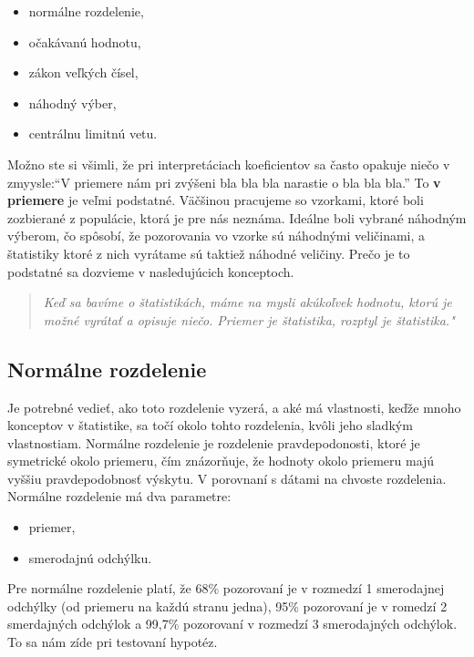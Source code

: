 \begin{itemize}
\tightlist
\item
  normálne rozdelenie,
\item
  očakávanú hodnotu,
\item
  zákon veľkých čísel,
\item
  náhodný výber,
\item
  centrálnu limitnú vetu.
\end{itemize}

Možno ste si všimli, že pri interpretáciach koeficientov sa často
opakuje niečo v zmyysle:``V priemere nám pri zvýšeni bla bla bla
narastie o bla bla bla.'' To \textbf{v priemere} je veľmi podstatné.
Väčšinou pracujeme so vzorkami, ktoré boli zozbierané z populácie, ktorá
je pre nás neznáma. Ideálne boli vybrané náhodným výberom, čo spôsobí,
že pozorovania vo vzorke sú náhodnými veličinami, a štatistiky ktoré z
nich vyrátame sú taktiež náhodné veličiny. Prečo je to podstatné sa
dozvieme v nasledujúcich konceptoch.

\begin{quote}
\emph{Keď sa bavíme o štatistikách, máme na mysli akúkoľvek hodnotu,
ktorú je možné vyrátať a opisuje niečo. Priemer je štatistika, rozptyl
je štatistika."}
\end{quote}

\hypertarget{normuxe1lne-rozdelenie}{%
\subsection{Normálne rozdelenie}\label{normuxe1lne-rozdelenie}}

Je potrebné vedieť, ako toto rozdelenie vyzerá, a aké má vlastnosti,
keďže mnoho konceptov v štatistike, sa točí okolo tohto rozdelenia,
kvôli jeho sladkým vlastnostiam. Normálne rozdelenie je rozdelenie
pravdepodonosti, ktoré je symetrické okolo priemeru, čím znázorňuje, že
hodnoty okolo priemeru majú vyššiu pravdepodobnosť výskytu. V porovnaní
s dátami na chvoste rozdelenia. Normálne rozdelenie má dva parametre:

\begin{itemize}
\tightlist
\item
  priemer,
\item
  smerodajnú odchýlku.
\end{itemize}

Pre normálne rozdelenie platí, že 68\% pozorovaní je v rozmedzí 1
smerodajnej odchýlky (od priemeru na každú stranu jedna), 95\%
pozorovaní je v romedzí 2 smerdajných odchýlok a 99,7\% pozorovaní v
rozmedzí 3 smerodajných odchýlok. To sa nám zíde pri testovaní hypotéz.

